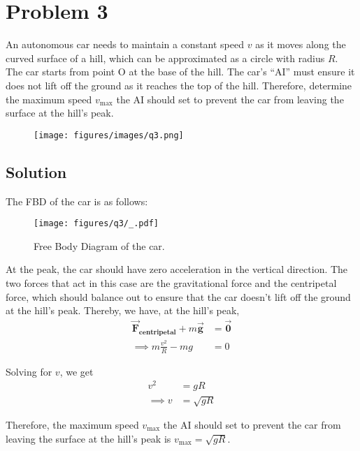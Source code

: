 \section*{Problem 3}

An autonomous car needs to maintain a constant speed \( v \) as it moves along the curved surface of a hill, which can be approximated as a circle with radius \( R \).
The car starts from point O at the base of the hill.
The car's ``AI'' must ensure it does not lift off the ground as it reaches the top of the hill.
Therefore, determine the maximum speed \( v_{\max} \) the AI should set to prevent the car from leaving the surface at the hill's peak.

\begin{figure*}[h]
    \centering
    \texttt{[image: figures/images/q3.png]}
\end{figure*}

\subsection*{Solution}

The FBD of the car is as follows:
\begin{figure*}[h]
    \centering
    \texttt{[image: figures/q3/\_.pdf]}
    \caption{
        Free Body Diagram of the car.
    }
\end{figure*}

At the peak, the car should have zero acceleration in the vertical direction.
The two forces that act in this case are the gravitational force and the centripetal force, which should balance out to ensure that the car doesn't lift off the ground at the hill's peak.
Thereby, we have, at the hill's peak,
\begin{align*}
    \vec{\mathbf{F}}_{\textbf{centripetal}} + m\vec{\mathbf{g}}
     & =
    \vec{\mathbf{0}} \\
    \implies
    m\frac{v^2}{R} - mg
     & =
    0
\end{align*}

Solving for \( v \), we get
\begin{align*}
    v^2 & = gR        \\
    \implies
    v   & = \sqrt{gR}
\end{align*}

Therefore, the maximum speed \( v_{\max} \) the AI should set to prevent the car from leaving the surface at the hill's peak is \( \boxed{v_{\max} = \sqrt{gR}} \).
